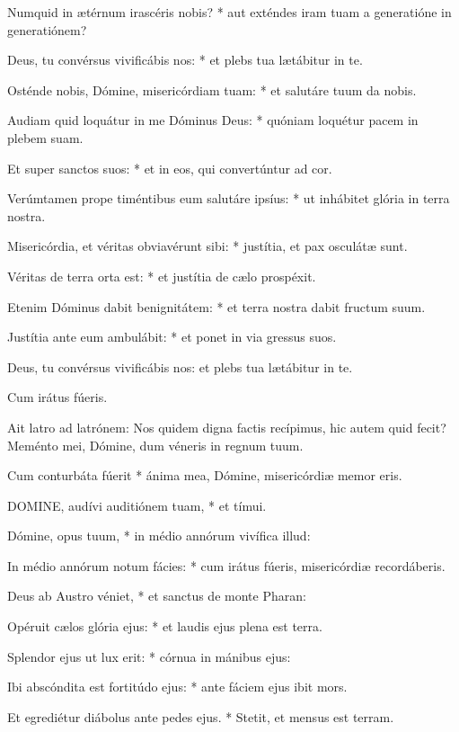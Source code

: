 Numquid in ætérnum irascéris nobis? * aut exténdes iram tuam a generatióne in generatiónem?

Deus, tu convérsus vivificábis nos: * et plebs tua lætábitur in te.

Osténde nobis, Dómine, misericórdiam tuam: * et salutáre tuum da nobis.

Audiam quid loquátur in me Dóminus Deus: * quóniam loquétur pacem in plebem suam.

Et super sanctos suos: * et in eos, qui convertúntur ad cor.

Verúmtamen prope timéntibus eum salutáre ipsíus: * ut inhábitet glória in terra nostra.

Misericórdia, et véritas obviavérunt sibi: * justítia, et pax osculátæ sunt.

Véritas de terra orta est: * et justítia de cælo prospéxit.

Etenim Dóminus dabit benignitátem: * et terra nostra dabit fructum suum.

Justítia ante eum ambulábit: * et ponet in via gressus suos.

 Deus, tu convérsus vivificábis nos: et plebs tua lætábitur in te.

 Cum irátus fúeris.


 Ait latro ad latrónem: Nos quidem digna factis recípimus, hic autem quid fecit? Meménto mei, Dómine, dum véneris in regnum tuum.

 Cum conturbáta fúerit * ánima mea, Dómine, misericórdiæ memor eris.


\lettrine[lines=2]{D}{OMINE}, audívi auditiónem tuam, * et tímui.

Dómine, opus tuum, * in médio annórum vivífica illud:

In médio annórum notum fácies: * cum irátus fúeris, misericórdiæ recordáberis.

Deus ab Austro véniet, * et sanctus de monte Pharan:

Opéruit cælos glória ejus: * et laudis ejus plena est terra.

Splendor ejus ut lux erit: * córnua in mánibus ejus:

Ibi abscóndita est fortitúdo ejus: * ante fáciem ejus ibit mors.

Et egrediétur diábolus ante pedes ejus. * Stetit, et mensus est terram.

